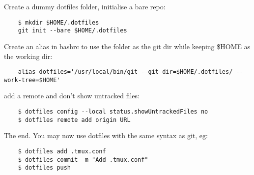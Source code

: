 Create a dummy dotfiles folder, initialise a bare repo:
\begin{verbatim}
	$ mkdir $HOME/.dotfiles
	git init --bare $HOME/.dotfiles
\end{verbatim}

Create an alias in bashrc to use the folder as the git dir while keeping \$HOME as the working dir:
\begin{verbatim}
	alias dotfiles='/usr/local/bin/git --git-dir=$HOME/.dotfiles/ --work-tree=$HOME'
\end{verbatim}

add a remote and don't show untracked files:
\begin{verbatim}
	$ dotfiles config --local status.showUntrackedFiles no
	$ dotfiles remote add origin URL
\end{verbatim}

The end. You may now use dotfiles with the same syntax as git, eg:
\begin{verbatim}
	$ dotfiles add .tmux.conf
	$ dotfiles commit -m "Add .tmux.conf"
	$ dotfiles push
\end{verbatim}
